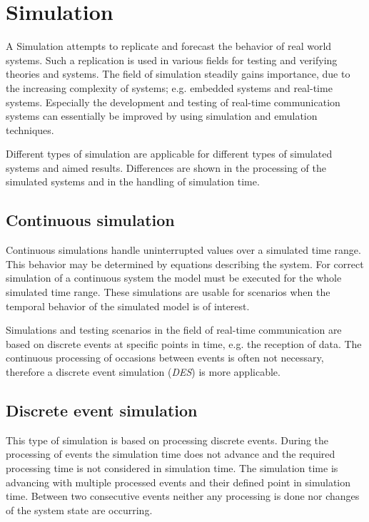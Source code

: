 \chapter{Simulation}
\label{cha:simulation}

A Simulation attempts to replicate and forecast the behavior of real world systems.
Such a replication is used in various fields for testing and verifying theories and systems.
The field of simulation steadily gains importance, due to the increasing complexity of systems; e.g. embedded systems and real-time systems.
Especially the development and testing of real-time communication systems can essentially be improved by using simulation and emulation techniques.

Different types of simulation are applicable for different types of simulated systems and aimed results.
Differences are shown in the processing of the simulated systems and in the handling of simulation time.
\cite[section 1.2]{mchaney2009understanding}

\section{Continuous simulation}
\label{sec:simulation_cont}
Continuous simulations handle uninterrupted values over a simulated time range.
This behavior may be determined by equations describing the system.
For correct simulation of a continuous system the model must be executed for the whole simulated time range.
These simulations are usable for scenarios when the temporal behavior of the simulated model is of interest. \cite[section 1.2.1]{mchaney2009understanding}

Simulations and testing scenarios in the field of real-time communication are based on discrete events at specific points in time, e.g. the reception of data.
The continuous processing of occasions between events is often not necessary, therefore a discrete event simulation (\emph{DES}) is more applicable.

\section{Discrete event simulation}
\label{sec:simulation_event}
This type of simulation is based on processing discrete events.
During the processing of events the simulation time does not advance and the required processing time is not considered in simulation time.
The simulation time is advancing with multiple processed events and their defined point in simulation time.
Between two consecutive events neither any processing is done nor changes of the system state are occurring. \cite[chapter 1]{matloff_introduction_2008}

